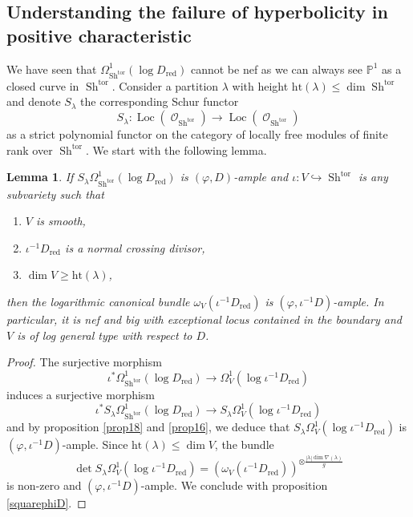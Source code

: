 \documentclass[11pt]{amsart}
\numberwithin{subsection}{section}
\numberwithin{figure}{section}
\numberwithin{table}{section}
\theoremstyle{1}
\newtheorem{lemma}[theorem]{Lemma}
\theoremstyle{2}
\DeclareMathOperator{\Sh}{Sh}
\DeclareMathOperator{\tor}{tor}
\DeclareMathOperator{\Oc}{\mathcal{O}}
\DeclareMathOperator{\Loc}{Loc}
\DeclareMathOperator{\red}{red}
\begin{document}
\subsection{Understanding the failure of hyperbolicity in positive characteristic}
We have seen that $\Omega^1_{\Sh^{\tor}}(\log D_{\red})$ cannot be nef as we can always see $\mathbb{P}^1$ as a closed curve in $\Sh^{\tor}$. Consider a partition $\lambda$ with height $\text{ht}(\lambda) \leq \dim \Sh^{\tor}$ and denote $S_{\lambda}$ the corresponding Schur functor 
\begin{equation*}
S_{\lambda} : \Loc(\Oc_{\Sh^{\tor}}) \rightarrow \Loc(\Oc_{\Sh^{\tor}})
\end{equation*}
as a strict polynomial functor on the category of locally free modules of finite rank over $\Sh^{\tor}$. We start with the following lemma.
\begin{lemma}\label{lem_log_general}
If $S_{\lambda} \Omega^1_{\Sh^{\tor}}(\log D_{\red})$ is $(\varphi,D)$-ample and $\iota : V \hookrightarrow \Sh^{\tor}$ is any subvariety such that
\begin{enumerate}
\item $V$ is smooth,
\item $\iota^{-1}D_{\red}$ is a normal crossing divisor,
\item $\dim V \geq \text{ht}(\lambda)$,
\end{enumerate}
then the logarithmic canonical bundle $\omega_{V}(\iota^{-1}D_{\red})$ is $(\varphi,\iota^{-1}D)$-ample. In particular, it is nef and big with exceptional locus contained in the boundary and $V$ is of log general type with respect to $D$. 
\end{lemma}
\begin{proof}
The surjective morphism
\begin{equation*}
\iota^*\Omega^1_{\Sh^{\tor}}(\log D_{\red}) \rightarrow \Omega^1_{V}(\log \iota^{-1}D_{\red})
\end{equation*}
induces a surjective morphism
\begin{equation*}
\iota^*S_{\lambda}\Omega^1_{\Sh^{\tor}}(\log D_{\red}) \rightarrow S_{\lambda}\Omega^1_{V}(\log \iota^{-1}D_{\red})
\end{equation*}
and by proposition \ref{prop18} and \ref{prop16}, we deduce that $S_{\lambda}\Omega^1_{V}(\log \iota^{-1}D_{\red})$ is $(\varphi,\iota^{-1}D)$-ample. Since $\text{ht}(\lambda) \leq \dim V$, the bundle
\begin{equation*}
\det S_{\lambda}\Omega^1_{V}(\log \iota^{-1}D_{\red}) = \left(\omega_{V}(\iota^{-1}D_{\red})\right)^{\otimes \frac{|\lambda|\dim\nabla(\lambda)}{g}}
\end{equation*}
is non-zero and $(\varphi,\iota^{-1}D)$-ample. We conclude with proposition \ref{squarephiD}.
\end{proof} 
\end{document}
